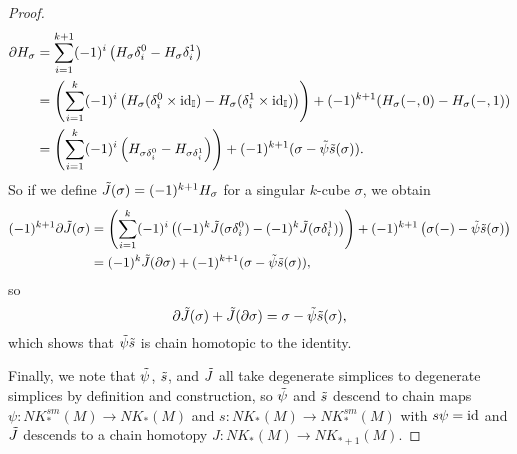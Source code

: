 \begin{proof}
	\begin{align*}
		\partial H_\sigma& = \sum_{i = 1}^{k+1} (-1)^i\left(H_\sigma \delta_i^0-H_\sigma \delta^1_i\right)\\
		& = \left(\sum_{i = 1}^{k} (-1)^i\left(H_\sigma (\delta_i^0 \times \mathrm{id}_{\mathbb{I}})-H_\sigma (\delta^1_i \times \mathrm{id}_{\mathbb{I}})\right)\right) +(-1)^{k+1}(H_\sigma(-,0)-H_\sigma(-,1))\\
		& = \left(\sum_{i = 1}^{k} (-1)^i\left(H_{\sigma \delta_i^0}-H_{\sigma\delta^1_i}\right)\right) +(-1)^{k+1}(\sigma -\tilde \psi\tilde s(\sigma)).
	\end{align*}
	So if we define $\tilde J(\sigma) = (-1)^{k+1}H_\sigma$ for a singular $k$-cube $\sigma$, we obtain
	\begin{align*}
		(-1)^{k+1}\partial \tilde J(\sigma)& = \left(\sum_{i = 1}^{k} (-1)^i\left( (-1)^k\tilde J(\sigma \delta_i^0)-(-1)^k\tilde J(\sigma\delta^1_i)\right)\right) +(-1)^{k+1}\left(\sigma(-)-\tilde \psi\tilde s(\sigma)\right)\\
		& = (-1)^k\tilde J(\partial \sigma)+(-1)^{k+1}(\sigma - \tilde \psi\tilde s(\sigma)),
	\end{align*}
	so $$\partial \tilde J(\sigma)+\tilde J(\partial \sigma) = \sigma - \tilde \psi\tilde s(\sigma),$$
	which shows that $\tilde \psi\tilde s$ is chain homotopic to the identity.

	Finally, we note that $\tilde \psi$, $\tilde s$, and $\tilde J$ all take degenerate simplices to degenerate simplices by definition and construction, so $\tilde \psi$ and $\tilde s$ descend to chain maps $\psi \colon NK_*^{sm}(M) \to NK_*(M)$ and $s \colon NK_*(M) \to NK_*^{sm}(M)$ with $s\psi = \mathrm{id}$ and $\tilde J$ descends to a chain homotopy $J \colon NK_*(M) \to NK_{*+1}(M)$.
\end{proof}